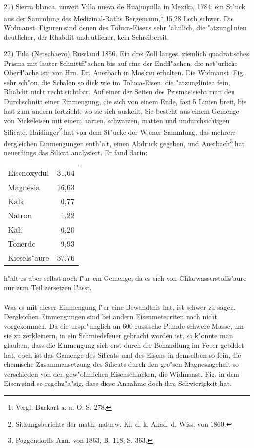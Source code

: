 \documentclass[a4paper, 11pt, oneside, german]{article}
\begin{document}
21) Sierra blanca, unweit Villa nueva de Huajuquilla in Mexiko, 1784; ein St"uck aus der Sammlung des Medizinal-Raths Bergemann,\footnote{Vergl. Burkart a. a. O. S. 278.} 15,28 Loth schwer. Die Widmanst. Figuren sind denen des Toluca-Eisens sehr "ahnlich, die "atzunglinien deutlicher, der Rhabdit undeutlicher, kein Schreibersit.

22) Tula (Netschaevo) Russland 1856. Ein drei Zoll langes, ziemlich quadratisches Prisma mit lauter Schnittfl"achen bis auf eine der Endfl"achen, die nat"urliche Oberfl"ache ist; von Hrn. Dr. Auerbach in Moskau erhalten. Die Widmanst. Fig. sehr sch"on, die Schalen so dick wie im Toluca-Eisen, die "atzunglinien fein, Rhabdit nicht recht sichtbar. Auf einer der Seiten des Prismas sieht man den Durchschnitt einer Einmengung, die sich von einem Ende, fast 5 Linien breit, bis fast zum andern fortzieht, wo sie sich auskeilt, Sie besteht aus einem Gemenge von Nickeleisen mit einem harten, schwarzen, matten und undurchsichtigen Silicate. Haidinger\footnote{Sitzungsberichte der math.-naturw. Kl. d. k. Akad. d. Wiss. von 1860.} hat von dem St"ucke der Wiener Sammlung, das mehrere dergleichen Einmengungen enth"alt, einen Abdruck gegeben, und Auerbach\footnote{Poggendorffs Ann. von 1863, B. 118, S. 363.} hat neuerdings das Silicat analysiert. Er fand darin:
\begin{center}
\begin{tabular}{ l r }
    Eisenoxydul & 31,64\\
    Magnesia & 16,63\\
    Kalk & 0,77\\
    Natron & 1,22\\
    Kali & 0,20\\
    Tonerde & 9,93\\
    Kiesels"aure & 37,76\\
\end{tabular}
\end{center}
h"alt es aber selbst noch f"ur ein Gemenge, da es sich von Chlorwasserstoffs"aure nur zum Teil zersetzen l"asst.
\paragraph{}
Was es mit dieser Einmengung f"ur eine Bewandtnis hat, ist schwer zu sagen. Dergleichen Einmengungen sind bei andern Eisenmeteoriten noch nicht vorgekommen. Da die urspr"unglich an 600 russische Pfunde schwere Masse, um sie zu zerkleinern, in ein Schmiedefeuer gebracht worden ist, so k"onnte man glauben, dass die Einmengung sich erst durch die Behandlung im Feuer gebildet hat, doch ist das Gemenge des Silicats und des Eisens in demselben so fein, die chemische Zusammensetzung des Silicats durch den gro"sen Magnesiagehalt so verschieden von den gew"ohnlichen Eisenschlacken, die Widmanst. Fig. in dem Eisen sind so regelm"a"sig, dass diese Annahme doch ihre Schwierigkeit hat.
\end{document}
